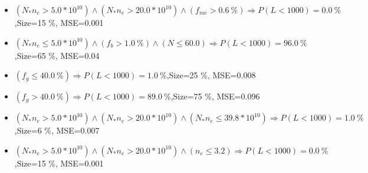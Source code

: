 \documentclass[numbered]{CSL}
\begin{document}
\begin{itemize}
\item $(N_* n_e > 5.0 * 10^{10}) \land (N_* n_e > 20.0 * 10^{10}) \land (f_{me} > 0.6~\%) \Rightarrow P(L < 1 000) = 0.0~\%$,\hfill Size=15 \%, MSE=0.001
\item $(N_* n_e \leq 5.0 * 10^{10}) \land (f_b > 1.0~\%) \land (N \leq 60.0) \Rightarrow P(L < 1 000) = 96.0~\%$,\hfill Size=65 \%, MSE=0.04
\item $(f_g \leq 40.0~\%) \Rightarrow P(L < 1 000) = 1.0~\%$,\hfill Size=25 \%, MSE=0.008
\item $(f_g > 40.0~\%) \Rightarrow P(L < 1 000) = 89.0~\%$,\hfill Size=75 \%, MSE=0.096
\item $(N_* n_e > 5.0 * 10^{10}) \land (N_* n_e > 20.0 * 10^{10}) \land (N_* n_e \leq 39.8 * 10^{10}) \Rightarrow P(L < 1 000) = 1.0~\%$,\hfill Size=6 \%, MSE=0.007
\item $(N_* n_e > 5.0 * 10^{10}) \land (N_* n_e > 20.0 * 10^{10}) \land (n_e \leq 3.2) \Rightarrow P(L < 1 000) = 0.0~\%$,\hfill Size=15 \%, MSE=0.001
\end{itemize}
\end{document}
